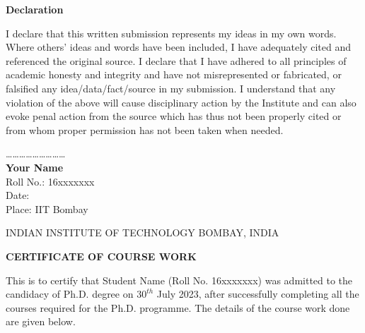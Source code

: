 \documentclass[12pt, a4paper, twoside, openright]{Thesis} %
\newcommand\myemptypage{
    \null
    \thispagestyle{empty}
    \addtocounter{page}{-1}
    \newpage
    }
\begin{document}
{\clearpage %

\myemptypage



{ %

\centerline{\textbf{\LARGE {Declaration}}}}
\vspace{3em}
I declare that this written submission represents my ideas in my own words. Where others' ideas and words have been included, I have adequately cited and referenced the original source. I declare that I have adhered to all principles of academic honesty and integrity and have not misrepresented or fabricated, or falsified any idea/data/fact/source in my submission. I understand that any violation of the above will cause disciplinary action by the Institute and can also evoke penal action from the source which has thus not been properly cited or from whom proper permission has not been taken when needed.

\bigskip
\bigskip
\bigskip
\bigskip

\begin{flushleft}
\ldots \ldots \ldots \ldots \ldots \ldots \ldots \ldots \ldots\\
\vspace{2mm}
\textbf{Your Name} \\
Roll No.: 16xxxxxxx \\
Date:  \\
Place: IIT Bombay
\end{flushleft}

\clearpage %
\myemptypage



{

\begin{center}
    \large INDIAN INSTITUTE OF TECHNOLOGY BOMBAY, INDIA
\end{center}

\begin{center}
    \textbf{CERTIFICATE OF COURSE WORK}
\end{center}    

\vspace{1cm}
This is to certify that Student Name (Roll No. 16xxxxxxx) was admitted
to the candidacy of Ph.D. degree on $30^{th}$ July 2023, after successfully completing all the courses required for the Ph.D. programme. The details of the course
work done are given below.

}}
\end{document}

